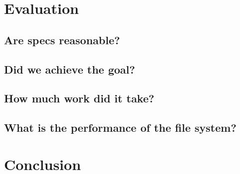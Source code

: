 \documentclass[onecolumn]{paper}
\begin{document}
\section{Evaluation}
        \subsection{Are specs reasonable?}
	\subsection{Did we achieve the goal?}
	\subsection{How much work did it take?}
	\subsection{What is the performance of the file system?}

\section{Conclusion}
\end{document}
